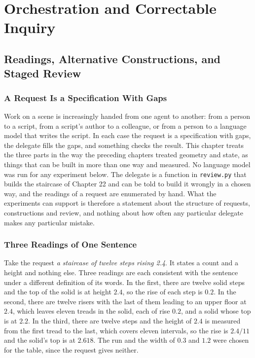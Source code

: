 \part{Orchestration and Correctable Inquiry}

\chapter{Readings, Alternative Constructions, and Staged Review}

\section{A Request Is a Specification With Gaps}

Work on a scene is increasingly handed from one agent to another: from a person to a script, from a script's author to a colleague, or from a person to a language model that writes the script. In each case the request is a specification with gaps, the delegate fills the gaps, and something checks the result. This chapter treats the three parts in the way the preceding chapters treated geometry and state, as things that can be built in more than one way and measured. No language model was run for any experiment below. The delegate is a function in \texttt{review.py} that builds the staircase of Chapter 22 and can be told to build it wrongly in a chosen way, and the readings of a request are enumerated by hand. What the experiments can support is therefore a statement about the structure of requests, constructions and review, and nothing about how often any particular delegate makes any particular mistake.

\section{Three Readings of One Sentence}

Take the request \emph{a staircase of twelve steps rising 2.4}. It states a count and a height and nothing else. Three readings are each consistent with the sentence under a different definition of its words. In the first, there are twelve solid steps and the top of the solid is at height $2.4$, so the rise of each step is $0.2$. In the second, there are twelve risers with the last of them leading to an upper floor at $2.4$, which leaves eleven treads in the solid, each of rise $0.2$, and a solid whose top is at $2.2$. In the third, there are twelve steps and the height of $2.4$ is measured from the first tread to the last, which covers eleven intervals, so the rise is $2.4/11$ and the solid's top is at $2.618$. The run and the width of $0.3$ and $1.2$ were chosen for the table, since the request gives neither.

